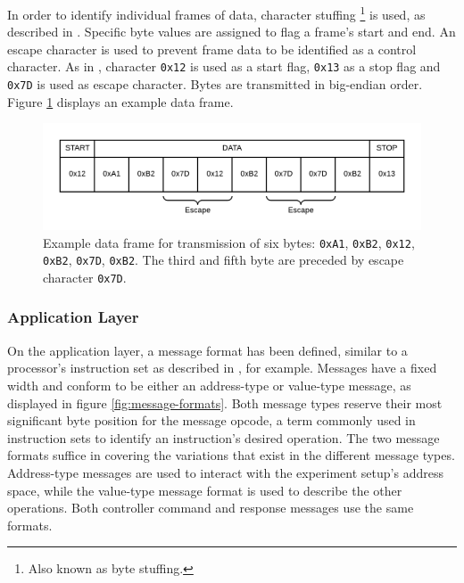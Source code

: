\documentclass[main.tex]{subfiles}
\begin{document}
In order to identify individual frames of data, character stuffing \footnote{Also known as byte stuffing.} is used, as described in \cite[p.180]{tanenbaumcomputer}. Specific byte values are assigned to flag a frame's start and end. An escape character is used to prevent frame data to be identified as a control character. As in \cite{Frami37}, character \texttt{0x12} is used as a start flag, \texttt{0x13} as a stop flag and \texttt{0x7D} is used as escape character. Bytes are transmitted in big-endian order. Figure \ref{fig:character-stuffing} displays an example data frame.

\begin{figure}
\centering
\caption{Example data frame for transmission of six bytes: \texttt{0xA1}, \texttt{0xB2}, \texttt{0x12}, \texttt{0xB2}, \texttt{0x7D}, \texttt{0xB2}. The third and fifth byte are preceded by escape character \texttt{0x7D}.}
\label{fig:character-stuffing}
\includegraphics[width=.8\textwidth]{img/character-stuffing}
\end{figure}

\subsubsection{Application Layer}

On the application layer, a message format has been defined, similar to a processor's instruction set as described in \cite{hennessy2013computer}, for example. Messages have a fixed width and conform to be either an address-type or value-type message, as displayed in figure \ref{fig:message-formats}.  Both message types reserve their most significant byte position for the message opcode, a term commonly used in instruction sets to identify an instruction's desired operation. The two message formats suffice in covering the variations that exist in the different message types. Address-type messages are used to interact with the experiment setup's address space, while the value-type message format is used to describe the other operations. Both controller command and response messages use the same formats. 
\end{document}
